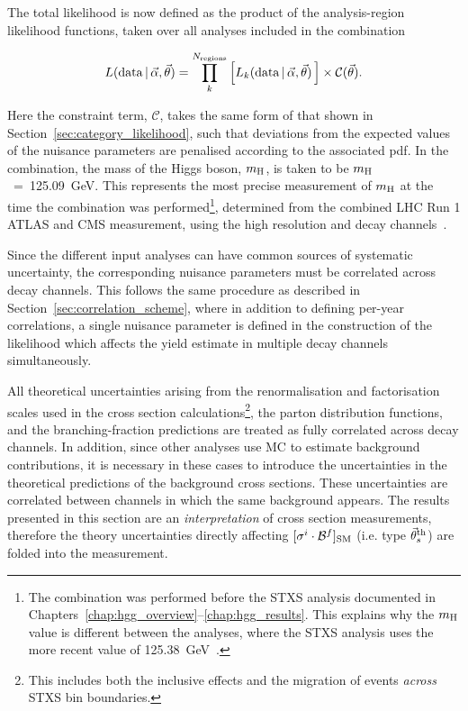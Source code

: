 The total likelihood is now defined as the product of the analysis-region likelihood functions, taken over all analyses included in the combination

\begin{equation}
    L({\rm{data}}\,|\,\vec{\alpha},\vec{\theta}) = \prod_{k}^{N_{\rm{regions}}} \Big[    L_k({\rm{data}}\,|\,\vec{\alpha},\vec{\theta}) \,\Big] \times \mathcal{C}(\vec{\theta}).
\end{equation}

\noindent
Here the constraint term, $\mathcal{C}$, takes the same form of that shown in Section~\ref{sec:category_likelihood}, such that deviations from the expected values of the nuisance parameters are penalised according to the associated pdf. In the combination, the mass of the Higgs boson, $m_{\rm{H}}$, is taken to be $m_{\rm{H}}$~=~125.09~GeV. This represents the most precise measurement of $m_{\rm{H}}$ at the time the combination was performed\footnote{The combination was performed before the \Hgg STXS analysis documented in Chapters~\ref{chap:hgg_overview}--\ref{chap:hgg_results}. This explains why the $m_{\rm{H}}$ value is different between the analyses, where the \Hgg STXS analysis uses the more recent value of 125.38~GeV~\cite{Sirunyan:2020xwk}.}, determined from the combined LHC Run 1 ATLAS and CMS measurement, using the high resolution \Hgg and \Hfl decay channels~\cite{Aad:2015zhl}.

Since the different input analyses can have common sources of systematic uncertainty, the corresponding nuisance parameters must be correlated across decay channels. This follows the same procedure as described in Section~\ref{sec:correlation_scheme}, where in addition to defining per-year correlations, a single nuisance parameter is defined in the construction of the likelihood which affects the yield estimate in multiple decay channels simultaneously. 

All theoretical uncertainties arising from the renormalisation and factorisation scales used in the cross section calculations\footnote{This includes both the inclusive effects and the migration of events \textit{across} STXS bin boundaries.}, the parton distribution functions, and the branching-fraction predictions are treated as fully correlated across decay channels. In addition, since other analyses use MC to estimate background contributions, it is necessary in these cases to introduce the uncertainties in the theoretical predictions of the background cross sections. These uncertainties are correlated between channels in which the same background appears. The results presented in this section are an \textit{interpretation} of cross section measurements, therefore the theory uncertainties directly affecting $[\sigma^i \cdot \mathcal{B}^{f}]_{\rm{SM}}$ (i.e. type $\vec{\theta}_s^{\rm{th}}$) are folded into the measurement.

